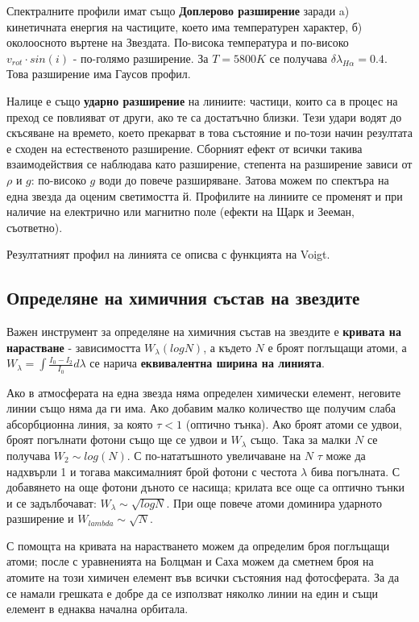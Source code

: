 \documentclass[a4paper,12pt]{article}
\let\oldAA\AA
\renewcommand{\AA}{\text{\normalfont\oldAA}}
\begin{document}
Спектралните профили имат също \textbf{Доплерово разширение} заради a) кинетичната енергия на частиците, което има температурен характер, б) околоосното въртене на Звездата. По-висока температура и по-високо $v_{rot} \cdot sin(i)$ - по-голямо разширение. За $T=5800 K$ се получава $\delta \lambda_{H\alpha}=0.4$\AA. Това разширение има Гаусов профил.

 Налице е също \textbf{ударно разширение} на линиите: частици, които са в процес на преход се повлияват от други, ако те са достатъчно близки. Тези удари водят до скъсяване на времето, което прекарват в това състояние и по-този начин резултата е сходен на естественото разширение. Сборният ефект от всички такива взаимодействия се наблюдава като разширение, степента на разширение зависи от $\rho$ и $g$: по-високо $g$ води до повече разширяване. Затова можем по спектъра на една звезда да оценим светимостта й. Профилите на линиите се променят и при наличие на електрично или магнитно поле (ефекти на Щарк и Зееман, съответно).

 Резултатният профил на линията се описва с функцията на Voigt.

\subsection{Определяне на химичния състав на звездите}

 Важен инструмент за определяне на химичния състав на звездите е \textbf{кривата на нарастване} - зависимостта $W_{\lambda}(logN)$, а където $N$ е броят поглъщащи атоми, а $W_{\lambda}= \int \frac{I_0 - I_2} {I_0} d\lambda$ се нарича \textbf{еквивалентна ширина на линията}.

 Ако в атмосферата на една звезда няма определен химически елемент, неговите линии също няма да ги има. Ако добавим малко количество ще получим слаба абсорбционна линия, за която $\tau<1$ (оптично тънка). Ако броят атоми се удвои, броят погълнати фотони също ще се удвои и $W_{\lambda}$ също. Така за малки $N$ се получава $W_2 \sim log(N)$. С по-нататъшното увеличаване на $N$ $\tau$ може да надхвърли 1 и тогава максималният брой фотони с честота $\lambda$ бива погълната. С добавянето на още фотони дъното се насища; крилата все още са оптично тънки и се задълбочават: $W_{\lambda} \sim \sqrt{logN}$. При още повече атоми доминира ударното разширение и $W_{lambda} \sim \sqrt{N}$.

 С помощта на кривата на нарастването можем да определим броя поглъщащи атоми; после с уравненията на Болцман и Саха можем да сметнем броя на атомите на този химичен елемент във всички състояния над фотосферата. За да се намали грешката е добре да се използват няколко линии на един и същи елемент в еднаква начална орбитала.
\end{document}
